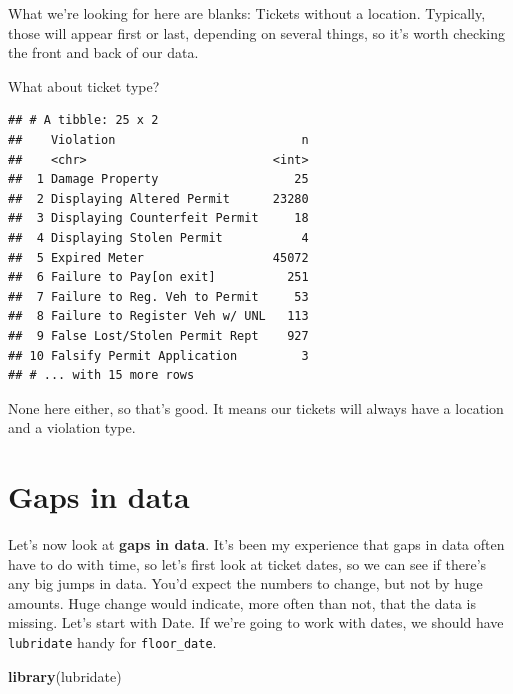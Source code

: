 \documentclass[]{book}
\newenvironment{Shaded}{\begin{snugshade}}{\end{snugshade}}
\newcommand{\KeywordTok}[1]{\textcolor[rgb]{0.13,0.29,0.53}{\textbf{#1}}}
\newcommand{\NormalTok}[1]{#1}
\newcommand{\OperatorTok}[1]{\textcolor[rgb]{0.81,0.36,0.00}{\textbf{#1}}}
\newcommand{\StringTok}[1]{\textcolor[rgb]{0.31,0.60,0.02}{#1}}
\begin{document}
What we're looking for here are blanks: Tickets without a location. Typically, those will appear first or last, depending on several things, so it's worth checking the front and back of our data.

What about ticket type?

\begin{Shaded}
\end{Shaded}

\begin{verbatim}
## # A tibble: 25 x 2
##    Violation                          n
##    <chr>                          <int>
##  1 Damage Property                   25
##  2 Displaying Altered Permit      23280
##  3 Displaying Counterfeit Permit     18
##  4 Displaying Stolen Permit           4
##  5 Expired Meter                  45072
##  6 Failure to Pay[on exit]          251
##  7 Failure to Reg. Veh to Permit     53
##  8 Failure to Register Veh w/ UNL   113
##  9 False Lost/Stolen Permit Rept    927
## 10 Falsify Permit Application         3
## # ... with 15 more rows
\end{verbatim}

None here either, so that's good. It means our tickets will always have a location and a violation type.

\hypertarget{gaps-in-data}{%
\section{Gaps in data}\label{gaps-in-data}}

Let's now look at \textbf{gaps in data}. It's been my experience that gaps in data often have to do with time, so let's first look at ticket dates, so we can see if there's any big jumps in data. You'd expect the numbers to change, but not by huge amounts. Huge change would indicate, more often than not, that the data is missing. Let's start with Date. If we're going to work with dates, we should have \texttt{lubridate} handy for \texttt{floor\_date}.

\begin{Shaded}
\begin{Highlighting}[]
\KeywordTok{library}\NormalTok{(lubridate)}
\end{Highlighting}
\end{Shaded}
\end{document}
